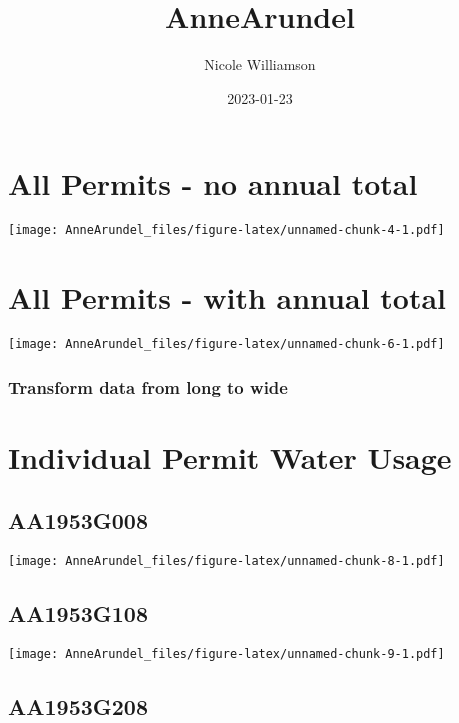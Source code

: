 \documentclass[
]{article}
\title{AnneArundel}
\author{Nicole Williamson}
\date{2023-01-23}
\begin{document}
\maketitle

\hypertarget{all-permits---no-annual-total}{%
\section{All Permits - no annual
total}\label{all-permits---no-annual-total}}

\texttt{[image: AnneArundel\_files/figure-latex/unnamed-chunk-4-1.pdf]}

\hypertarget{all-permits---with-annual-total}{%
\section{All Permits - with annual
total}\label{all-permits---with-annual-total}}

\texttt{[image: AnneArundel\_files/figure-latex/unnamed-chunk-6-1.pdf]}

\hypertarget{transform-data-from-long-to-wide}{%
\subsubsection{Transform data from long to
wide}\label{transform-data-from-long-to-wide}}

\hypertarget{individual-permit-water-usage}{%
\section{Individual Permit Water
Usage}\label{individual-permit-water-usage}}

\hypertarget{aa1953g008}{%
\subsection{AA1953G008}\label{aa1953g008}}

\texttt{[image: AnneArundel\_files/figure-latex/unnamed-chunk-8-1.pdf]}

\hypertarget{aa1953g108}{%
\subsection{AA1953G108}\label{aa1953g108}}

\texttt{[image: AnneArundel\_files/figure-latex/unnamed-chunk-9-1.pdf]}

\hypertarget{aa1953g208}{%
\subsection{AA1953G208}\label{aa1953g208}}
\end{document}
